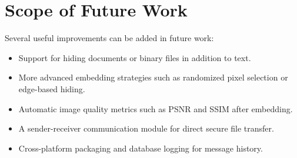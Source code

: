 \documentclass[12pt]{report}
\begin{document}
\section{Scope of Future Work}
Several useful improvements can be added in future work:
\begin{itemize}
    \item Support for hiding documents or binary files in addition to text.
    \item More advanced embedding strategies such as randomized pixel selection or edge-based hiding.
    \item Automatic image quality metrics such as PSNR and SSIM after embedding.
    \item A sender-receiver communication module for direct secure file transfer.
    \item Cross-platform packaging and database logging for message history.
\end{itemize}

\newpage
\renewcommand\bibname{References}


\end{document}
